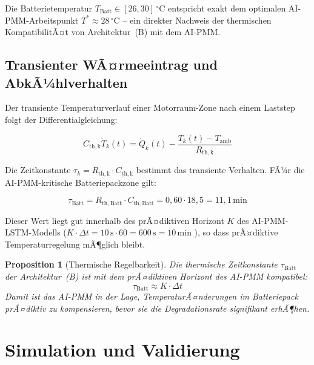 ﻿\documentclass[12pt,a4paper]{article}
\newtheorem{proposition}[theorem]{Proposition}
\begin{document}
Die Batterietemperatur $T_\mathrm{Batt} \in [26, 30]\,^\circ\mathrm{C}$ entspricht
exakt dem optimalen AI-PMM-Arbeitspunkt $T^* \approx 28\,^\circ\mathrm{C}$
\cite{Epp2026liion} -- ein direkter Nachweis der thermischen KompatibilitÃ¤t von
Architektur~(B) mit dem AI-PMM.

\subsection{Transienter WÃ¤rmeeintrag und AbkÃ¼hlverhalten}

Der transiente Temperaturverlauf einer Motorraum-Zone nach einem Laststep
folgt der Differentialgleichung:

\begin{equation}
	C_\mathrm{th,k} \dot{T}_k(t) = \dot{Q}_k(t) - \frac{T_k(t) - T_\mathrm{amb}}{R_\mathrm{th,k}}
	\label{eq:transient_eq}
\end{equation}

Die Zeitkonstante $\tau_k = R_\mathrm{th,k} \cdot C_\mathrm{th,k}$ bestimmt
das transiente Verhalten. FÃ¼r die AI-PMM-kritische Batteriepackzone gilt:

\begin{equation}
	\tau_\mathrm{Batt} = R_\mathrm{th,Batt} \cdot C_\mathrm{th,Batt}
	= 0{,}60 \cdot 18{,}5 = 11{,}1\,\mathrm{min}
	\label{eq:tau_batt}
\end{equation}

Dieser Wert liegt gut innerhalb des prÃ¤diktiven Horizont $K$ des AI-PMM-LSTM-Modells
($K \cdot \Delta t = 10\,\mathrm{s} \cdot 60 = 600\,\mathrm{s} = 10\,\mathrm{min}$
\cite{Epp2026liion}), so dass prÃ¤diktive Temperaturregelung mÃ¶glich bleibt.

\begin{proposition}[Thermische Regelbarkeit]
	\label{prop:regelbarkeit}
	Die thermische Zeitkonstante $\tau_\mathrm{Batt}$ der Architektur~(B) ist
	mit dem prÃ¤diktiven Horizont des AI-PMM kompatibel:
	\begin{equation}
		\tau_\mathrm{Batt} \approx K \cdot \Delta t
		\label{eq:tau_kompatibel}
	\end{equation}
	Damit ist das AI-PMM in der Lage, TemperaturÃ¤nderungen im Batteriepack
	prÃ¤diktiv zu kompensieren, bevor sie die Degradationsrate signifikant erhÃ¶hen.
\end{proposition}

\section{Simulation und Validierung}
\label{sec:simulation}
\end{document}
